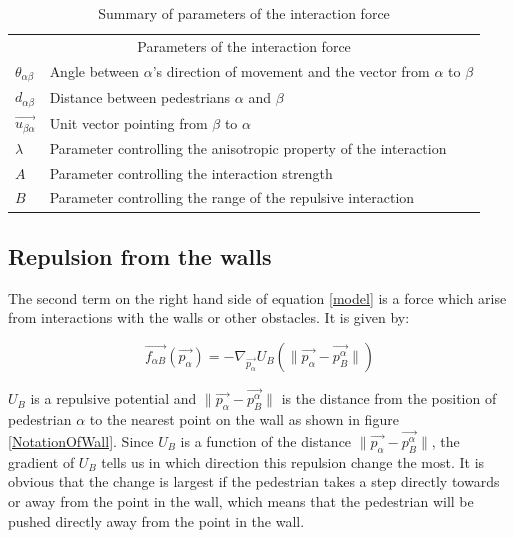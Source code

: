 \begin{table}
    \centering
    \begin{tabular}{l l}
        \toprule
        \multicolumn{2}{c}{\textsf{Parameters of the interaction force}}\\
        $\theta_{\alpha \beta}$ & Angle between $\alpha$'s direction of 
        movement and the vector from $\alpha$ to $\beta$\\
        $d_{\alpha \beta}$& Distance between pedestrians $\alpha$ and $\beta$ \\
        $\overrightarrow{u_{\beta \alpha}}$& Unit vector pointing from $\beta$ to $\alpha$ \\
        $\lambda$& Parameter controlling the anisotropic property of the 
        interaction\\
        $A$& Parameter controlling the interaction strength \\
        $B$& Parameter controlling the range of the repulsive interaction  \\
        \bottomrule
    \end{tabular}
    \caption{Summary of parameters of the interaction force}
    \label{tbl:interaction-forces}
\end{table}

\subsection{Repulsion from the walls}\label{seq:repulsion-walls}
The second term on the right hand side of equation \eqref{model} is a force which 
arise from interactions with the walls or other obstacles. It is given by:

\begin{equation}\label{wallpotential}
    \overrightarrow{f_{\alpha B}} \left( \overrightarrow{p_{\alpha}} \right) =
    - \nabla_{\overrightarrow{p_{\alpha}}} U_{B}
    \left( \| \overrightarrow{p_{\alpha}} - \overrightarrow{p_{B}^{\alpha}} \| \right)
\end{equation}

$U_B$ is a repulsive potential and $\|\overrightarrow{p_{\alpha}} - \overrightarrow{p_{B}^{\alpha}}\|$ 
is the distance from the position of pedestrian $\alpha$ to the nearest point on the 
wall as shown in figure \ref{NotationOfWall}. Since $U_B$ is a function of the distance 
$\| \overrightarrow{p_{\alpha}} - \overrightarrow{p_{B}^{\alpha}} \|$, the gradient of $U_B$ tells us in 
which direction this repulsion change the most. It is obvious that the change is 
largest if the pedestrian takes a step directly towards or away from the point in the wall, 
which means that the pedestrian will be pushed directly away from the point in the wall.

